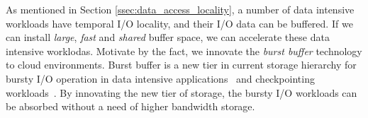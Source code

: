 % 
% 


As mentioned in Section \ref{ssec:data_access_locality}, 
a number of data intensive workloads have temporal I/O locality, and their I/O
data can be buffered.
If we can install \emph{large}, \emph{fast} and \emph{shared} buffer space, we
can accelerate these data intensive worklodas.
Motivate by the fact, we innovate the \emph{burst buffer} technology to cloud
environments.
Burst buffer is a new tier in current storage hierarchy for bursty I/O operation
in data intensive applications~\cite{on_the_role_of_burst_buffers} and
checkpointing workloads~\cite{A_User-Level_InfiniBand-Based_File_System_and_Checkpoint_Strategy_for_Burst_Buffers}.
By innovating the new tier of storage, the bursty I/O workloads
can be absorbed without a need of higher bandwidth storage.

